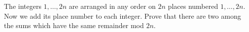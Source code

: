 The integers $1, \ldots, 2n$ are arranged in any order on $2n$ places numbered $1, \ldots, 2n$. Now we add its place number to each integer. Prove that there are two among the sums which have the same remainder mod $2n$.
